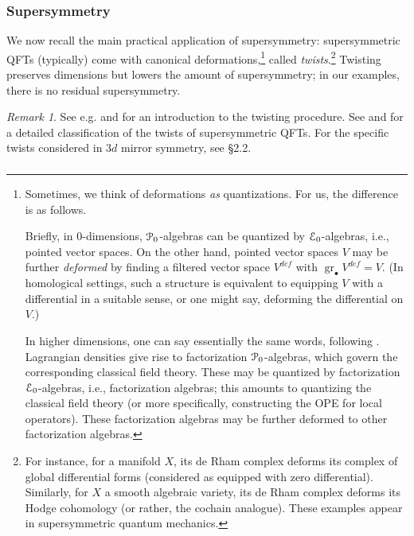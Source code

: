 \documentclass[reqno,11pt]{amsart}
\numberwithin{equation}{subsection}
\theoremstyle{remark}
\newtheorem{rem}[thm]{Remark}
\newcommand{\sE}{{\EuScript E}}
\newcommand{\sP}{{\EuScript P}}
\newcommand{\on}{\operatorname}
\newcommand{\gr}{\on{gr}}
\renewcommand{\dot}{\bullet}
\begin{document}
\subsubsection{Supersymmetry}

We now recall the main practical 
application of supersymmetry: supersymmetric
QFTs (typically) come with canonical 
deformations,\footnote{Sometimes, we think of
deformations \emph{as} quantizations. For us, the difference
is as follows.

Briefly, in $0$-dimensions, $\sP_0$-algebras can be quantized
by $\sE_0$-algebras, 
i.e., pointed vector spaces. On the other hand, pointed vector
spaces $V$ may be further \emph{deformed} by 
finding a filtered vector space $V^{def}$ with $\gr_{\dot} V^{def} = V$.
(In homological settings, such a structure is equivalent to equipping $V$ with 
a differential in a suitable sense, or one might say, deforming
the differential on $V$.)

In higher dimensions, one can say essentially the same words, following
\cite{costello-gwilliam-i}. Lagrangian
densities give rise to factorization $\sP_0$-algebras, 
which govern the corresponding
classical field theory. These may be quantized by factorization
$\sE_0$-algebras, i.e., factorization algebras; this amounts to 
quantizing the classical field theory (or more specifically, constructing
the OPE for local operators). These factorization algebras
may be further deformed to other factorization algebras.}
called \emph{twists}.\footnote{For instance,
for a manifold $X$, its de Rham complex deforms
its complex of global differential forms (considered
as equipped with zero differential). Similarly,
for $X$ a smooth
algebraic variety, its de Rham complex 
deforms its Hodge cohomology (or rather, the cochain
analogue). These examples appear in supersymmetric
quantum mechanics.} Twisting preserves dimensions
but lowers the amount of supersymmetry; in our examples,
there is no residual supersymmetry.

\begin{rem}

See e.g. \cite{costello-ss-2-4} and \cite{costello-scheimbauer} 
for an introduction to the twisting procedure. See 
\cite{elliott-safronov} and \cite{esw}
for a detailed classification of the twists of supersymmetric QFTs. For the specific
twists considered in $3d$ mirror symmetry, see \cite{dggh} \S 2.2.

\end{rem}

\subsubsection{}
\end{document}
